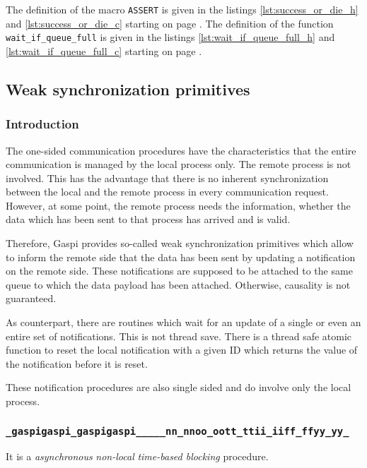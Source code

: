 \documentclass{article}
\makeatletter
\newlength{\st}\setlength{\st}{0pt}
\newcommand{\zerowsep}{\hskip 0pt plus 0.1pt minus 0.1pt}
\newcommand{\ZSEP}[1]{\ifx#1\@@@EOZ@@@\let\next\relax\else\ifx#1\_#1\zerowsep\else#1\fi\let\next\ZSEP\fi\next}
\newcommand{\zsep}[1]{\ZSEP{}#1\@@@EOZ@@@}
\newcommand{\gaspiprefix}{gaspi}
\newcommand{\GASPI}{{\sc Gaspi}}
\newcommand{\function}[1]{{\tt #1}}
\newcommand{\gaspifunction}[1]{\function{\protect\zsep{\gaspiprefix\_#1}}}
\newcommand{\gaspisemantic}[1]{{\emph{#1}}}
\makeatother
\begin{document}
The definition of the macro \verb|ASSERT| is given in the listings
\ref{lst:success_or_die_h} and \ref{lst:success_or_die_c} starting on
page \pageref{lst:success_or_die_h}. The definition of the function
\verb|wait_if_queue_full| is given in the listings
\ref{lst:wait_if_queue_full_h} and \ref{lst:wait_if_queue_full_c}
starting on page \pageref{lst:wait_if_queue_full_h}.

\subsection{Weak synchronization primitives}


\subsubsection{Introduction}

The one-sided communication procedures have the characteristics that the 
entire communication is managed by the local process only. The 
remote process is not involved. This has the advantage that there
is no inherent synchronization between the local and the remote 
process in every communication request. However, at some point,
the remote process needs the information, whether the data
which has been sent to that process has arrived and is valid.

Therefore, \GASPI{} provides so-called weak synchronization 
primitives which allow to inform the remote side that
the data has been sent by updating a notification on the remote
side. These notifications are supposed to be attached
to the same queue to which the data payload has been 
attached. Otherwise, causality is not guaranteed.  

As counterpart, there are 
routines which wait for an update of a single or even an entire set of 
notifications. This is not thread save. There is a thread safe atomic function
to reset the local notification with a given ID which returns the value 
of the notification before it is reset. 

These notification procedures are also single sided and do
involve only the local process.  


\subsubsection{\gaspifunction{notify}}

It is a \gaspisemantic{asynchronous} \gaspisemantic{non-local}
\gaspisemantic{time-based blocking} procedure.
\end{document}
